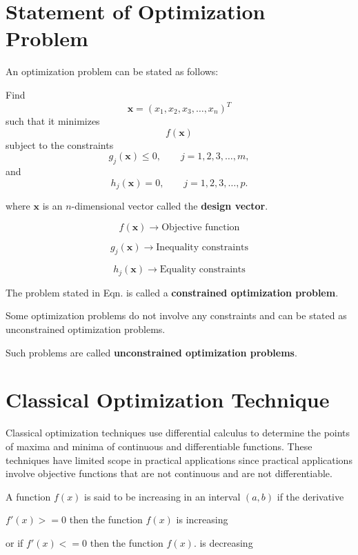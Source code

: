 \documentclass{article}
\begin{document}
\section*{Statement of Optimization Problem}

An optimization problem can be stated as follows:

Find
\[
\mathbf{x}=(x_1,x_2,x_3,\ldots,x_n)^T
\]
such that it minimizes
\[
f(\mathbf{x})
\]
subject to the constraints
\[
g_j(\mathbf{x}) \leq 0,\qquad j=1,2,3,\ldots,m,
\]
and
\[
h_j(\mathbf{x}) = 0,\qquad j=1,2,3,\ldots,p.
\]

where $\mathbf{x}$ is an $n$-dimensional vector called the \textbf{design vector}.

\[
f(\mathbf{x}) \rightarrow \text{Objective function}
\]

\[
g_j(\mathbf{x}) \rightarrow \text{Inequality constraints}
\]

\[
h_j(\mathbf{x}) \rightarrow \text{Equality constraints}
\]





The problem stated in Eqn. is called a \textbf{constrained optimization problem}.

Some optimization problems do not involve any constraints and can be stated as unconstrained optimization problems.

Such problems are called \textbf{unconstrained optimization problems}.

\section*{Classical Optimization Technique}

Classical optimization techniques use differential calculus to determine the points of maxima and minima of continuous and differentiable functions. These techniques have limited scope in practical applications since practical applications involve objective functions that are not continuous and are not differentiable.

\vspace{0.5cm}

A function $f(x)$ is said to be increasing in an interval $(a,b)$ if the derivative

$f'(x)>=0$
then 
the function $f(x)$ is increasing 
\vspace{0.2cm}

or 
if $f'(x)<=0$
then 
the function $f(x)$. is decreasing 

\begin{center}

\end{center}
\end{document}
